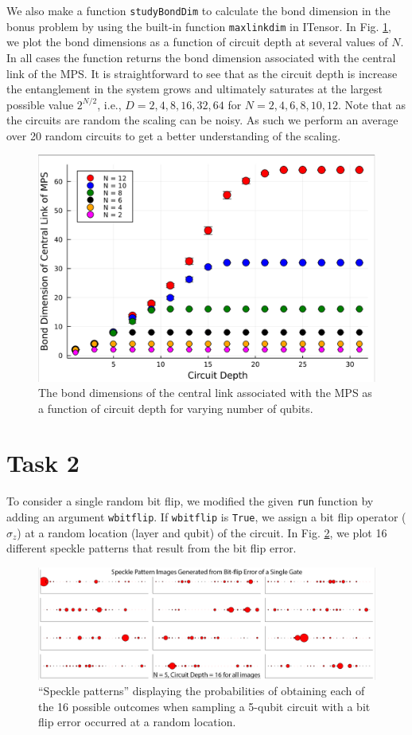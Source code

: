 \documentclass[12pt]{article}
\begin{document}
We also make a function \texttt{studyBondDim} to calculate the bond dimension in the bonus problem by using the built-in function \texttt{maxlinkdim} in ITensor. In Fig. \ref{fig:bonddim}, we plot the bond dimensions as a function of circuit depth at several values of $N$. In all cases the function returns the bond dimension associated with the central link of the MPS. It is straightforward to see that as the circuit depth is increase the entanglement in the system grows and ultimately saturates at the largest possible value $2^{N/2}$, i.e., $D = 2, 4, 8, 16, 32, 64$ for $N = 2, 4, 6, 8, 10 ,12$. Note that as the circuits are random the scaling can be noisy. As such we perform an average over 20 random circuits to get a better understanding of the scaling. 

\begin{figure}
	\centering
	\includegraphics [width=0.8\linewidth] {figures/Task1b}
	\caption{
		The bond dimensions of the central link associated with the MPS as a function of circuit depth for varying number of qubits.}
	\label{fig:bonddim}
\end{figure}


\section*{Task 2}

To consider a single random bit flip, we modified the given \texttt{run} function by adding an argument \texttt{wbitflip}. If \texttt{wbitflip} is \texttt{True}, we assign a bit flip operator ($\hat{\sigma}_z$) at a random location (layer and qubit) of the circuit. In Fig. \ref{fig:bitflip}, we plot 16 different speckle patterns that result from the bit flip error.

\begin{figure}[th]
	\centering
	\includegraphics [width=\linewidth] {figures/Task2}
	\caption{
		 ``Speckle patterns'' displaying the probabilities of obtaining each of the 16 possible outcomes when sampling a 5-qubit circuit with a bit flip error occurred at a random location.
	}
	\label{fig:bitflip}
\end{figure}
\end{document}
